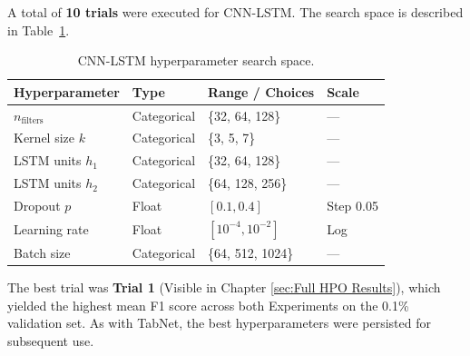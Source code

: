 \documentclass[../main.tex]{subfiles}
\begin{document}
A total of \textbf{10 trials} were executed for CNN-LSTM.  The search space is described in Table~\ref{tab:hpo-cnnlstm-space}.

\begin{table}[H]
\centering
\caption{CNN-LSTM hyperparameter search space.}
\label{tab:hpo-cnnlstm-space}
\small
\begin{tabular}{llll}
\toprule
\textbf{Hyperparameter}  & \textbf{Type}      & \textbf{Range / Choices}   & \textbf{Scale} \\
\midrule
$n_{\text{filters}}$     & Categorical        & \{32, 64, 128\}             & —              \\
Kernel size $k$          & Categorical        & \{3, 5, 7\}                 & —              \\
LSTM units $h_1$         & Categorical        & \{32, 64, 128\}             & —              \\
LSTM units $h_2$         & Categorical        & \{64, 128, 256\}            & —              \\
Dropout $p$              & Float              & $[0.1, 0.4]$                & Step 0.05      \\
Learning rate            & Float              & $[10^{-4}, 10^{-2}]$        & Log            \\
Batch size               & Categorical        & \{64, 512, 1024\}           & —              \\
\bottomrule
\end{tabular}
\end{table}

The best trial was \textbf{Trial 1} (Visible in Chapter \ref{sec:Full HPO Results}), which yielded the highest mean F1 score across both Experiments on the 0.1\% validation set.  As with TabNet, the best hyperparameters were persisted for subsequent use.
\end{document}

